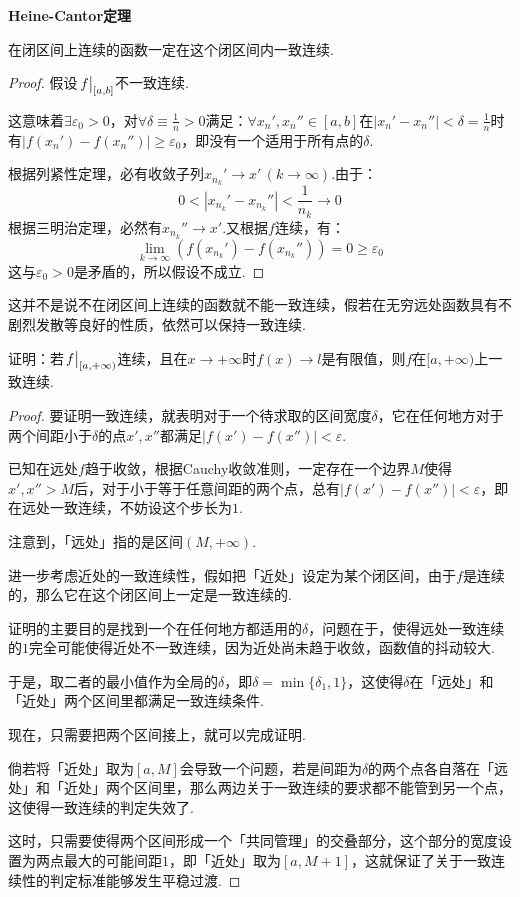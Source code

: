 \begin{theorem}
    \label{thm:HeineCantorTheorem}
    \textbf{Heine-Cantor定理}

    在闭区间上连续的函数一定在这个闭区间内一致连续.
\end{theorem}

\begin{proof}
    假设$\eval{f}_{[a,b]}$不一致连续.

    这意味着$\exists \varepsilon_0>0$，对$\forall \delta\equiv\frac{1}{n}>0$满足：$\forall x_n',x_n'' \in [a,b]$在$|x_n'-x_n''|<\delta=\frac{1}{n}$时有$|f(x_n')-f(x_n'')|\geqslant \varepsilon_0$，即没有一个适用于所有点的$\delta$.

    根据列紧性定理，必有收敛子列$x_{n_k}'\to x'\,(k\to\infty)$.由于：
    \[0<|x_{n_k}'-x_{n_k}''|<\frac{1}{n_k}\to 0\]
    根据三明治定理，必然有$x_{n_k}'' \to x'$.又根据$f$连续，有：
    \[\lim_{k\to\infty}\left(f(x_{n_k}')-f(x_{n_k}'')\right)=0 \geqslant \varepsilon_0\]
    这与$\varepsilon_0>0$是矛盾的，所以假设不成立.
\end{proof}

这并不是说不在闭区间上连续的函数就不能一致连续，假若在无穷远处函数具有不剧烈发散等良好的性质，依然可以保持一致连续.

\begin{question}
    证明：若$\eval{f}_{[a,+\infty)}$连续，且在$x\to+\infty$时$f(x)\to l$是有限值，则$f$在$[a,+\infty)$上一致连续.
\end{question}

\begin{proof}
    要证明一致连续，就表明对于一个待求取的区间宽度$\delta$，它在任何地方对于两个间距小于$\delta$的点$x',x''$都满足$|f(x')-f(x'')|<\varepsilon$.

    已知在远处$f$趋于收敛，根据Cauchy收敛准则，一定存在一个边界$M$使得$x',x''>M$后，对于小于等于任意间距的两个点，总有$|f(x')-f(x'')|<\varepsilon$，即在远处一致连续，不妨设这个步长为$1$.

    注意到，「远处」指的是区间$(M,+\infty)$.

    进一步考虑近处的一致连续性，假如把「近处」设定为某个闭区间，由于$f$是连续的，那么它在这个闭区间上一定是一致连续的.

    证明的主要目的是找到一个在任何地方都适用的$\delta$，问题在于，使得远处一致连续的$1$完全可能使得近处不一致连续，因为近处尚未趋于收敛，函数值的抖动较大.

    于是，取二者的最小值作为全局的$\delta$，即$\delta=\min\{\delta_1,1\}$，这使得$\delta$在「远处」和「近处」两个区间里都满足一致连续条件.

    现在，只需要把两个区间接上，就可以完成证明.

    倘若将「近处」取为$[a,M]$会导致一个问题，若是间距为$\delta$的两个点各自落在「远处」和「近处」两个区间里，那么两边关于一致连续的要求都不能管到另一个点，这使得一致连续的判定失效了.

    这时，只需要使得两个区间形成一个「共同管理」的交叠部分，这个部分的宽度设置为两点最大的可能间距$1$，即「近处」取为$[a,M+1]$，这就保证了关于一致连续性的判定标准能够发生平稳过渡.
\end{proof}